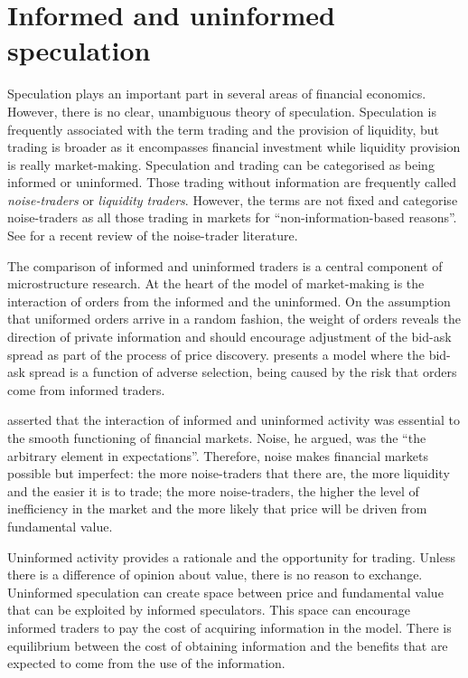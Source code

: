 \documentclass[ijfs,article,submit,oneauthor,pdftex,10pt,a4paper]{mdpi}
\begin{document}
\section{Informed and uninformed speculation}
Speculation plays an important part in several areas of financial economics.  However, there is no clear, unambiguous theory of speculation.  Speculation is frequently associated with the term trading and the provision of liquidity, but trading is broader as it encompasses financial investment while liquidity provision is really market-making. Speculation and trading can be categorised as being informed or uninformed. Those trading without information are frequently called \emph{noise-traders} or \emph{liquidity traders}.  However, the terms are not fixed and  \citet[p. 1]{GortonNoise} categorise noise-traders as all those trading in markets for ``non-information-based reasons''.  See \citet{Ramiah201589} for a recent review of the noise-trader literature. 

The comparison of informed and uninformed traders is a central component of microstructure research.  At the heart of the \citet{Kyle1985Continuous} model of market-making is the interaction of orders from the informed and the uninformed.  On the assumption that uniformed orders arrive in a random fashion, the weight of orders reveals the direction of private information and should encourage adjustment of the bid-ask spread as part of the process of price discovery.  \citet{glosten1985bid} presents a model where the bid-ask spread is a function of adverse selection, being caused by the risk that orders come from informed traders.  

\citet[p.529]{BlackNoise} asserted that the interaction of informed and uninformed activity was essential to the smooth functioning of financial markets. Noise, he argued, was the  ``the arbitrary element in expectations''. Therefore, noise makes financial markets possible but imperfect: the more noise-traders that there are, the more liquidity and the easier it is to trade; the more noise-traders, the higher the level of inefficiency in the market and the more likely that price will be driven from fundamental value. 

Uninformed activity provides a rationale and the opportunity for trading. Unless there is a difference of opinion about value, there is no reason to exchange. Uninformed speculation can create space between price and fundamental value that can be exploited by informed speculators.  This space can encourage informed traders to pay the cost of acquiring information in the \citet{Grossman1980Impossibility} model.  There is equilibrium between the cost of obtaining information and the benefits that are expected to come from the use of the information.  
\end{document}
